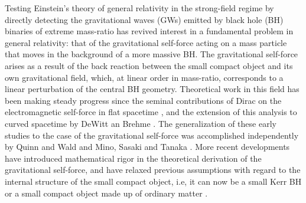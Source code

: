 \newcommand{\Real}{\mbox{Re}}
\newcommand{\Imag}{\mbox{Im}}
\newcommand{\Pade}{Pad\'{e}\xspace}
\newcommand{\pade}{\Pade}



%
\def\ie{{\it i.e.}}  \def\eg{{\it e.g.}}
\def\lap{\hbox{${_{\displaystyle<}\atop^{\displaystyle\sim}}$}}
\def\gap{\hbox{${_{\displaystyle>}\atop^{\displaystyle\sim}}$}}
\def\lesssim{\mathrel{\hbox{\rlap{\hbox{\lower4pt\hbox{$\sim$}}}\hbox{$<$}}}}
\def\gtrsim{\mathrel{\hbox{\rlap{\hbox{\lower4pt\hbox{$\sim$}}}\hbox{$>$}}}}
\def\alt{\mathrel{\hbox{\rlap{\hbox{\lower4pt\hbox{$\sim$}}}\hbox{$<$}}}}
\def\agt{\mathrel{\hbox{\rlap{\hbox{\lower4pt\hbox{$\sim$}}}\hbox{$>$}}}}
\def\PRD{{\it Phys. Rev.} D~}
\def\PRL{{\it Phys.Rev.} Lett~}
\def\apjl{{\it Astrophys. J.} Lett~}
\def\Msun{M_\odot}
\def\PR{{\it Phys. Rev.}}
\def\CQG{{\it Class. Quantum Grav.}}
\def\aaps{{\it A\&AS~ }}
\def\pasj{{\it PASJ }}
\def\mnras{{\it MNRAS}} 
\def\gta{\ifmmode {\mathbin{\lower 3pt\hbox   %
    {$\,\rlap{\raise 5pt\hbox{$\char'076$}}\mathchar"7218\,$}}}
    \else {${\mathbin{\lower 3pt\hbox
    {$\rlap{\raise 5pt\hbox{$\char'076$}}\mathchar"7218\,$}}}
    $}\fi}
\def\lta{\ifmmode {\,\mathbin{\lower 3pt\hbox   %
    {$\,\rlap{\raise 5pt\hbox{$\char'074$}}\mathchar"7218\,$}}}
    \else {${\mathbin{\lower 3pt\hbox
    {$\rlap{\raise 5pt\hbox{$\char'074$}}\mathchar"7218\,$}}}
    $}\fi}

    



Testing Einstein's theory of general relativity in the strong-field regime by directly detecting the gravitational waves (GWs) emitted by black hole (BH) binaries of extreme mass-ratio has revived interest in a fundamental problem in general relativity: that of the gravitational self-force acting on a mass particle that moves in the background of a more massive BH. The gravitational self-force arises as  a result of the back reaction between the  small compact object and its own gravitational field, which, at linear order in mass-ratio, corresponds to a linear perturbation of the central BH geometry. Theoretical work in this field has been making steady progress since the seminal contributions of Dirac on the electromagnetic self-force in flat spacetime \cite{dirac}, and the extension of this analysis to curved spacetime by DeWitt an Brehme \cite{dewitt}.   The generalization of these early studies to the case of the gravitational self-force was accomplished independently by Quinn and Wald \cite{qwald} and 
Mino, Sasaki and Tanaka \cite{mino}. More recent developments have introduced mathematical rigor in the theoretical derivation of the gravitational self-force, and have relaxed previous assumptions with regard to the internal structure of the small compact object, i.e, it can now be a small Kerr BH or a small compact object made up of ordinary matter \cite{grallaI,grallaII}. 


